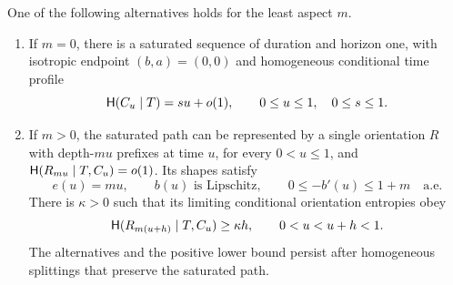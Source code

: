 \begin{proposition}
\label{prop:isotropic-reduction}
One of the following alternatives holds for the least aspect $m$.
\begin{enumerate}
\item If $m=0$, there is a saturated sequence of duration and horizon
one, with isotropic endpoint $(b,a)=(0,0)$ and homogeneous conditional
time profile
\[
 \mathsf H(C_u\mid T)=su+o(1),\qquad 0\le u\le1,
 \quad 0\le s\le1.
\]
\item If $m>0$, the saturated path can be represented by a single
orientation $R$ with depth-$mu$ prefixes at time $u$, for every
$0<u\le1$, and
$\mathsf H(R_{mu}\mid T,C_u)=o(1)$.  Its shapes satisfy
\[
 e(u)=mu,\qquad b(u)\text{ is Lipschitz},\qquad
                 0\le-b'(u)\le1+m\quad\text{a.e.}
\]
There is $\kappa>0$ such that its limiting conditional orientation
entropies obey
\begin{equation}
 \mathsf H(R_{m(u+h)}\mid T,C_u)\ge\kappa h,
                  \qquad 0<u<u+h<1.
 \label{eq:orientation-growth}
\end{equation}
The alternatives and the positive lower bound persist after homogeneous
splittings that preserve the saturated path.
\end{enumerate}
\end{proposition}
